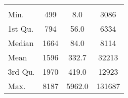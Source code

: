 \begin{tabular}{lS[table-format=5.1]S[table-format=5.1]S[table-format=5.1]}
&  &  &  \\
 Min.    & 499 & 8.0 & 3086 \\
 1st Qu. & 794 & 56.0 & 6334 \\
 Median  & 1664 & 84.0 & 8114 \\
 Mean    & 1596 & 332.7 & 32213 \\
 3rd Qu. & 1970 & 419.0 & 12923 \\
 Max.    & 8187 & 5962.0 & 131687 \\
\end{tabular}
